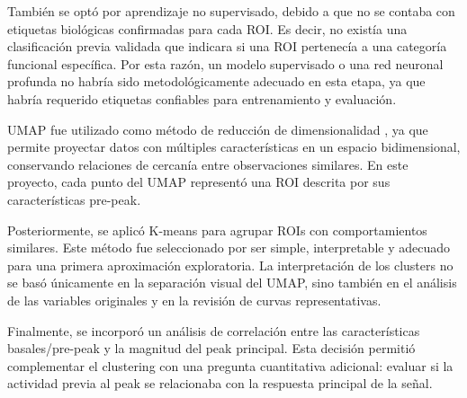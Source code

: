\documentclass[10pt,twocolumn]{article}
\begin{document}
También se optó por aprendizaje no supervisado, debido a que no se contaba con etiquetas biológicas confirmadas para cada ROI. Es decir, no existía una clasificación previa validada que indicara si una ROI pertenecía a una categoría funcional específica. Por esta razón, un modelo supervisado o una red neuronal profunda no habría sido metodológicamente adecuado en esta etapa, ya que habría requerido etiquetas confiables para entrenamiento y evaluación.

UMAP fue utilizado como método de reducción de dimensionalidad \cite{umap2018}, ya que permite proyectar datos con múltiples características en un espacio bidimensional, conservando relaciones de cercanía entre observaciones similares. En este proyecto, cada punto del UMAP representó una ROI descrita por sus características pre-peak.

Posteriormente, se aplicó K-means para agrupar ROIs con comportamientos similares. Este método fue seleccionado por ser simple, interpretable y adecuado para una primera aproximación exploratoria. La interpretación de los clusters no se basó únicamente en la separación visual del UMAP, sino también en el análisis de las variables originales y en la revisión de curvas representativas.

Finalmente, se incorporó un análisis de correlación entre las características basales/pre-peak y la magnitud del peak principal. Esta decisión permitió complementar el clustering con una pregunta cuantitativa adicional: evaluar si la actividad previa al peak se relacionaba con la respuesta principal de la señal.
\end{document}
